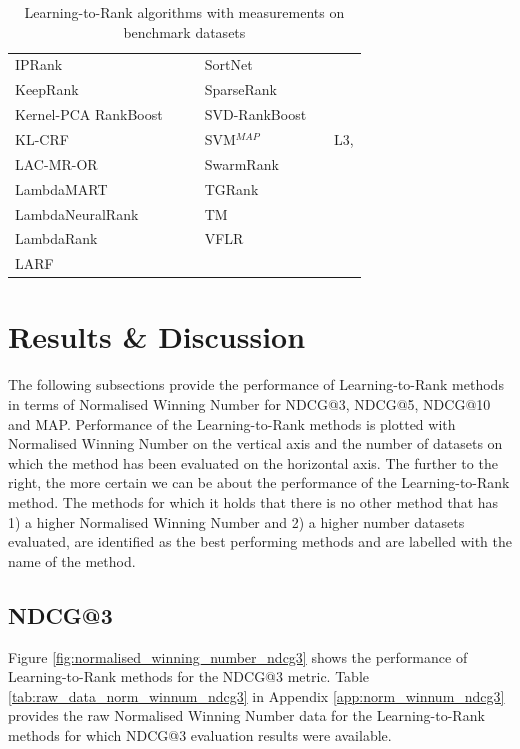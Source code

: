 \documentclass{sig-alternate-2013}
\begin{document}
\begin{table}[!h!p]
\begin{tabular}{|l|l|l||l|l|l|}
IPRank & \cite{Wang2009b} & \cite{Wang2009b, Torkestani2012} & SortNet & \cite{Rigutini2008} & \cite{Rigutini2008,Freno2011} \\
KeepRank & \cite{Chen2009} & \cite{Chen2009} & SparseRank & \cite{Lai2013b} & \cite{Lai2013b} \\ 
Kernel-PCA RankBoost & \cite{Duh2008} & \cite{Duh2008, Sato2013} & SVD-RankBoost & \cite{Lin2009} & \cite{Lin2009} \\
KL-CRF & \cite{Volkovs2011} & \cite{Volkovs2011} & SVM$^{MAP}$ & \cite{Yue2007} & L3, \cite{Wang2012, Xu2008, Niu2012} \\ 
LAC-MR-OR & \cite{Veloso2008} & \cite{Veloso2008} & SwarmRank & \cite{Diaz-Aviles2009} & \cite{Sato2013} \\ 
LambdaMART & \cite{Burges2010} & \cite{Asadi2013a, Ganjisaffar2011c} & TGRank & \cite{Lai2013} & \cite{Lai2013} \\ 
LambdaNeuralRank & \cite{Papini2012} & \cite{Papini2012} & TM & \cite{Zhou2008} & \cite{Zhou2008, Papini2012, Tan2013} \\ 
LambdaRank & \cite{Burges2006} &  & VFLR & \cite{Cai2012} & \cite{Cai2012} \\ 
LARF & \cite{Torkestani2012} & \cite{Torkestani2012} &  &  &  \\ 
\end{tabular}
\caption{Learning-to-Rank algorithms with measurements on benchmark datasets}
\label{tab:ltr_methods_used}
\end{table}

\section{Results \& Discussion}
The following subsections provide the performance of Learning-to-Rank methods in terms of Normalised Winning Number for NDCG@3, NDCG@5, NDCG@10 and MAP. Performance of the Learning-to-Rank methods is plotted with Normalised Winning Number on the vertical axis and the number of datasets on which the method has been evaluated on the horizontal axis. The further to the right, the more certain we can be about the performance of the Learning-to-Rank method. The methods for which it holds that there is no other method that has 1) a higher Normalised Winning Number and 2) a higher number datasets evaluated, are identified as the best performing methods and are labelled with the name of the method.

\subsection{NDCG@3}
Figure \ref{fig:normalised_winning_number_ndcg3} shows the performance of Learning-to-Rank methods for the NDCG@3 metric. Table \ref{tab:raw_data_norm_winnum_ndcg3} in Appendix \ref{app:norm_winnum_ndcg3} provides the raw Normalised Winning Number data for the Learning-to-Rank methods for which NDCG@3 evaluation results were available.\\
\end{document}
